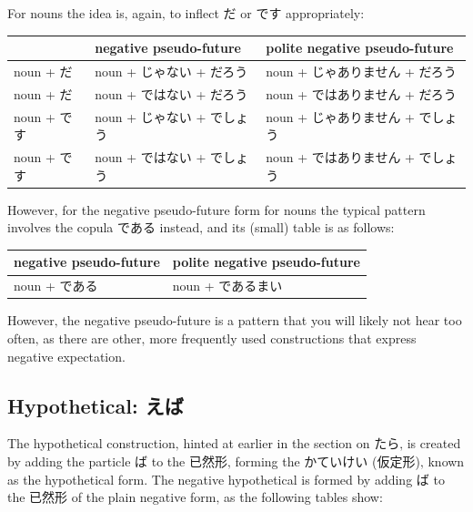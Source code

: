 \documentclass[11pt, b5paper, twoside, openright, onecolumn]{book}
\makeatletter
\newcommand*{\rubystack}[2]{{\relscale{0.5}%
  \begin{tabular}[b]{@{}c@{}}%
    {#1}\\%
   {\textscale{2}{#2}}%
  \end{tabular}}%
}
\DeclareRobustCommand*{\ruby}[2]{%
  \mbox{%
    \setlength{\parskip}{0ex}%
    \BeginAccSupp{method=pdfstringdef,ActualText={#1}}%
      \rubystack{\phantom{#2}}{#1}%
      \llap{%
        \rubystack{#2}{\phantom{#1}}%
      }%
    \EndAccSupp{}%
  }%
}
\renewcommand*{\ruby}[2]{#2 (#1)}%
\newenvironment{mytabular}[1]{\noindent\hspace{0.4in}
\begin{tabular}[h]{#1}}{\end{tabular}}
\newenvironment{mytabularcentered}[1]{\noindent
\begin{center}\begin{tabular}[h]{#1}}{\end{tabular}\end{center}}
\makeatother
\begin{document}
For nouns the idea is‚ again‚ to inflect だ or です appropriately:

\vspace{0.5cm}
\smaller
\begin{center}
\begin{mytabularcentered}{| l  l  l |}\hline 
\rule{0pt}{2.4ex} & negative pseudo-future & polite negative pseudo-future\\ 
\hline
\rule{0pt}{2.4ex}noun + だ & noun + じゃない + だろう & noun + じゃありません + だろう\\ 
\rule{0pt}{2.4ex}noun + だ & noun + ではない + だろう & noun + ではありません + だろう\\ 
\rule{0pt}{2.4ex}noun + です & noun + じゃない + でしょう & noun + じゃありません + でしょう\\ 
\rule{0pt}{2.4ex}noun + です & noun + ではない + でしょう & noun + ではありません + でしょう\\ 
\hline 
\end{mytabularcentered}
\end{center}
\larger
\vspace{0.5cm}


However‚ for the negative pseudo-future form for nouns the typical pattern involves the copula である instead‚ and its (small) table is as follows:

\vspace{0.5cm}
\smaller
\begin{mytabular}{| l  l |}\hline 
\rule{0pt}{2.4ex}negative pseudo-future & polite negative pseudo-future\\ 
\hline
\rule{0pt}{2.4ex}noun + である & noun + であるまい\\ 
\hline 
\end{mytabular}
\larger
\vspace{0.5cm}


However‚ the negative pseudo-future is a pattern that you will likely not hear too often‚ as there are other‚ more frequently used constructions that express negative expectation.

\subsection{Hypothetical: えば}

The hypothetical construction‚ hinted at earlier in the section on たら‚ is created by adding the particle ば to the 已然形‚ forming the \ruby{仮定形}{かていけい}‚ known as the hypothetical form. The negative hypothetical is formed by adding ば to the 已然形 of the plain negative form‚ as the following tables show:
\end{document}
